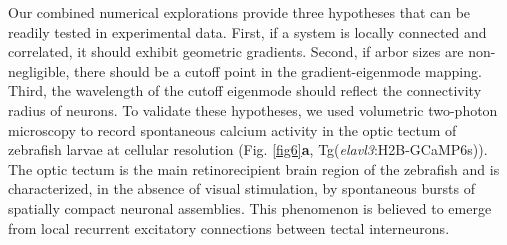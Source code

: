 \documentclass{article}
\begin{document}
Our combined numerical explorations provide three hypotheses that can be readily tested in experimental data. First, if a system is locally connected and correlated, it should exhibit geometric gradients. Second, if arbor sizes are non-negligible, there should be a cutoff point in the gradient-eigenmode mapping. Third, the wavelength of the cutoff eigenmode should reflect the connectivity radius of neurons. To validate these hypotheses, we used volumetric two-photon microscopy to record spontaneous calcium activity in the optic tectum of zebrafish larvae at cellular resolution (Fig. \ref{fig6}\textbf{a}, Tg(\textit{elavl3}:H2B-GCaMP6s)). The optic tectum is the main retinorecipient brain region of the zebrafish and is characterized, in the absence of visual stimulation, by spontaneous bursts of spatially compact neuronal assemblies. This phenomenon is believed to emerge from local recurrent excitatory connections between tectal interneurons.
\end{document}
